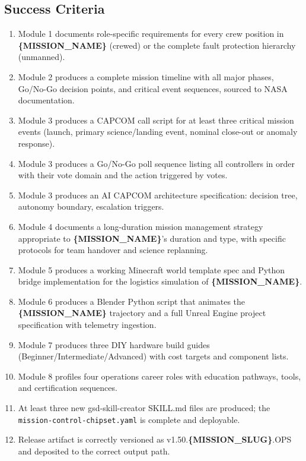 \documentclass[11pt,letterpaper]{article}
\newcommand{\nogo}{\textcolor{alert}{\textbf{\sffamily[NO-GO]}}}
\newcommand{\param}[1]{\textcolor{paramred}{\textbf{\{#1\}}}}
\begin{document}
\subsection{Success Criteria}

\begin{enumerate}[leftmargin=*, label=\textbf{SC\arabic*.}]
  \item Module 1 documents role-specific requirements for every crew position in \param{MISSION\_NAME} (crewed) or the complete fault protection hierarchy (unmanned).
  \item Module 2 produces a complete mission timeline with all major phases, Go/No-Go decision points, and critical event sequences, sourced to NASA documentation.
  \item Module 3 produces a CAPCOM call script for at least three critical mission events (launch, primary science/landing event, nominal close-out or anomaly response).
  \item Module 3 produces a Go/No-Go poll sequence listing all controllers in order with their vote domain and the action triggered by \nogo{} votes.
  \item Module 3 produces an AI CAPCOM architecture specification: decision tree, autonomy boundary, escalation triggers.
  \item Module 4 documents a long-duration mission management strategy appropriate to \param{MISSION\_NAME}'s duration and type, with specific protocols for team handover and science replanning.
  \item Module 5 produces a working Minecraft world template spec and Python bridge implementation for the logistics simulation of \param{MISSION\_NAME}.
  \item Module 6 produces a Blender Python script that animates the \param{MISSION\_NAME} trajectory and a full Unreal Engine project specification with telemetry ingestion.
  \item Module 7 produces three DIY hardware build guides (Beginner/Intermediate/Advanced) with cost targets and component lists.
  \item Module 8 profiles four operations career roles with education pathways, tools, and certification sequences.
  \item At least three new gsd-skill-creator SKILL.md files are produced; the \texttt{mission-control-chipset.yaml} is complete and deployable.
  \item Release artifact is correctly versioned as v1.50.\param{MISSION\_SLUG}.OPS and deposited to the correct output path.
\end{enumerate}
\end{document}
